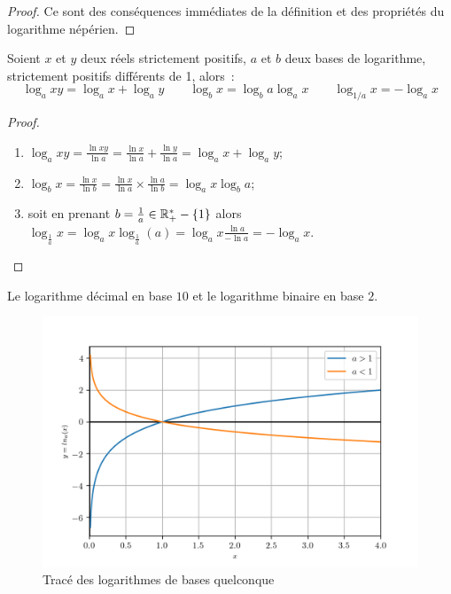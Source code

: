\begin{proof}
    Ce sont des conséquences immédiates de la définition et des propriétés 
    du logarithme népérien.
\end{proof}

\begin{prop}
    Soient \(x\) et \(y\) deux réels strictement positifs, \(a\) et \(b\) 
    deux bases de logarithme, strictement positifs différents de 1, alors~:
    \begin{equation}
        \log_{a}xy = \log_{a}x + \log_{a}y \qquad \log_{b}x = \log_{b}a 
        \log_{a}x \qquad \log_{1/a} x = -\log_{a} x
    \end{equation}
\end{prop}

\begin{proof}
    \begin{enumerate}
        \item \(\log_a xy= \frac{\ln xy}{\ln a}= \frac{\ln x}{\ln a} 
            +\frac{\ln y}{\ln a} = \log_{a}x+\log_{a}y\);
        \item \(\log_b x = \frac{\ln x}{\ln b} = \frac{\ln x}{\ln a} \times 
            \frac{\ln a}{\ln b} = \log_{a}x \log_{b}a\);
        \item soit en prenant \(b = \frac{1}{a} \in \mathbb{R}_{+}^{*}-\{1\}\) alors 
            \(\log_{\frac{1}{a}}x = \log_{a}x \log_{\frac{1}{a}}(a) = \log_{a}x
            \frac{\ln a}{-\ln a} = -\log_{a}x\).
    \end{enumerate}
\end{proof}
Le logarithme décimal en base \(10\) et le logarithme binaire en base \(2\).

\begin{figure}
    \centering
    \includegraphics[scale = 1.0]{logbase.png}
    \caption{Tracé des logarithmes de bases quelconque}
    \label{fig:traceloga}
\end{figure}

